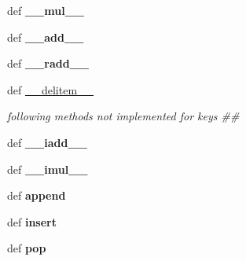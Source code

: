 \begin{CompactItemize}
\item 
\hypertarget{classPyPedal_1_1odict_1_1__keys_229d95b35e8c0179a64654ad3df12412}{
def \textbf{\_\-\_\-mul\_\-\_\-}}
\label{classPyPedal_1_1odict_1_1__keys_229d95b35e8c0179a64654ad3df12412}

\item 
\hypertarget{classPyPedal_1_1odict_1_1__keys_85dc204e6eb27aded6b449c55cb3155f}{
def \textbf{\_\-\_\-add\_\-\_\-}}
\label{classPyPedal_1_1odict_1_1__keys_85dc204e6eb27aded6b449c55cb3155f}

\item 
\hypertarget{classPyPedal_1_1odict_1_1__keys_7e9169a0c5460d12e35eb3b2e7a83852}{
def \textbf{\_\-\_\-radd\_\-\_\-}}
\label{classPyPedal_1_1odict_1_1__keys_7e9169a0c5460d12e35eb3b2e7a83852}

\item 
\hypertarget{classPyPedal_1_1odict_1_1__keys_a51d908afa2b6f63a81f9e077b520cc4}{
def \hyperlink{classPyPedal_1_1odict_1_1__keys_a51d908afa2b6f63a81f9e077b520cc4}{\_\-\_\-delitem\_\-\_\-}}
\label{classPyPedal_1_1odict_1_1__keys_a51d908afa2b6f63a81f9e077b520cc4}

\begin{CompactList}\small\item\em following methods not implemented for keys \#\# \item\end{CompactList}\item 
\hypertarget{classPyPedal_1_1odict_1_1__keys_d2014801a1b19fd5896178d671808001}{
def \textbf{\_\-\_\-iadd\_\-\_\-}}
\label{classPyPedal_1_1odict_1_1__keys_d2014801a1b19fd5896178d671808001}

\item 
\hypertarget{classPyPedal_1_1odict_1_1__keys_c64257d0939825bc538ef6d06c92848b}{
def \textbf{\_\-\_\-imul\_\-\_\-}}
\label{classPyPedal_1_1odict_1_1__keys_c64257d0939825bc538ef6d06c92848b}

\item 
\hypertarget{classPyPedal_1_1odict_1_1__keys_c82e5cde573edb28342b18a959978dcd}{
def \textbf{append}}
\label{classPyPedal_1_1odict_1_1__keys_c82e5cde573edb28342b18a959978dcd}

\item 
\hypertarget{classPyPedal_1_1odict_1_1__keys_de696a077cd64e81892176b17e192bca}{
def \textbf{insert}}
\label{classPyPedal_1_1odict_1_1__keys_de696a077cd64e81892176b17e192bca}

\item 
\hypertarget{classPyPedal_1_1odict_1_1__keys_384833a1b7e500fb6bf7ba60c36e3312}{
def \textbf{pop}}
\label{classPyPedal_1_1odict_1_1__keys_384833a1b7e500fb6bf7ba60c36e3312}


\end{CompactItemize}

